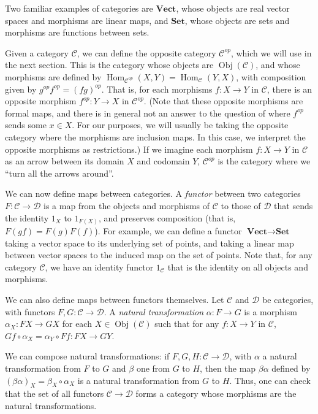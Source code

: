 \documentclass[a4paper,11pt,leqno]{article}
\newcommand{\curC}{\mathscr{C}}
\newcommand{\curD}{\mathscr{D}}
\newcommand{\of}{\circ}
\newcommand{\Hom}{\ensuremath{\operatorname{Hom}}}
\newcommand{\Obj}{\ensuremath{\operatorname{Obj}}}
\theoremstyle{definition}
\begin{document}
Two familiar examples of categories are $\textbf{Vect}$, whose objects are real vector spaces and morphisms are linear maps, and $\textbf{Set}$, whose objects are sets and morphisms are functions between sets.

Given a category $\curC$, we can define the opposite category $\curC^{op}$, which we will use in the next section.
This is the category whose objects are $\Obj(\curC)$, and whose morphisms are defined by $\Hom_{\curC^{op}}(X, Y) = \Hom_{\curC}(Y, X)$, with composition given by $g^{op}f^{op} = (fg)^{op}$.
That is, for each morphisms $f: X\to Y$ in $\curC$, there is an opposite morphism $f^{op}: Y\to X$ in $\curC^{op}$.
(Note that these opposite morphisms are formal maps, and there is in general not an answer to the question of where $f^{op}$ sends some $x\in X$.
For our purposes, we will usually be taking the opposite category where the morphisms are inclusion maps.
In this case, we interpret the opposite morphisms as restrictions.)
If we imagine each morphism $f: X\to Y$ in $\curC$ as an arrow between its domain $X$ and codomain $Y$, $\curC^{op}$ is the category where we ``turn all the arrows around''.

We can now define maps between categories.
A \emph{functor} between two categories $F: \curC\to \curD$ is a map from the objects and morphisms of $\curC$ to those of $\curD$ that sends the identity $1_X$ to $1_{F(X)}$, and preserves composition (that is, $F(gf) = F(g)F(f)$).
For example, we can define a functor $\textbf{Vect}\to \textbf{Set}$ taking a vector space to its underlying set of points, and taking a linear map between vector spaces to the induced map on the set of points.
Note that, for any category $\curC$, we have an identity functor $1_\curC$ that is the identity on all objects and morphisms.

We can also define maps between functors themselves.
Let $\curC$ and $\curD$ be categories, with functors $F, G: \curC\to \curD$.
A \emph{natural transformation} $\alpha: F\to G$ is a morphism $\alpha_X: FX\to GX$ for each $X\in \Obj(\curC)$ such that for any $f: X\to Y$ in $\curC$, $Gf\of \alpha_X = \alpha_Y\of Ff: FX\to GY$.

We can compose natural transformations: if $F, G, H: \curC\to \curD$, with $\alpha$ a natural transformation from $F$ to $G$ and $\beta$ one from $G$ to $H$, then the map $\beta\alpha$ defined by $(\beta\alpha)_X = \beta_X\of \alpha_X$ is a natural transformation from $G$ to $H$.
Thus, one can check that the set of all functors $\curC\to\curD$ forms a category whose morphisms are the natural transformations.
\end{document}
